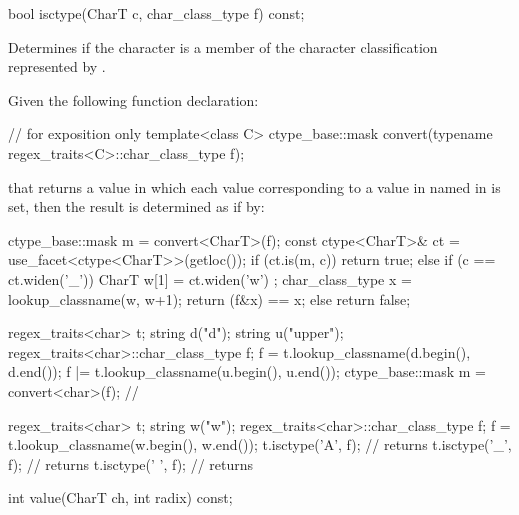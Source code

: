 %
\begin{itemdecl}
bool isctype(CharT c, char_class_type f) const;
\end{itemdecl}

\begin{itemdescr}
\pnum
\effects
Determines if the character  is a member of the character
classification represented by .

\pnum
\returns
Given the following function declaration:
\begin{codeblock}
// for exposition only
template<class C>
  ctype_base::mask convert(typename regex_traits<C>::char_class_type f);
\end{codeblock}
that returns a value in which each  value corresponding to
a value in  named in  is set, then the
result is determined as if by:
\begin{codeblock}
ctype_base::mask m = convert<CharT>(f);
const ctype<CharT>& ct = use_facet<ctype<CharT>>(getloc());
if (ct.is(m, c)) {
  return true;
} else if (c == ct.widen('_')) {
  CharT w[1] = { ct.widen('w') };
  char_class_type x = lookup_classname(w, w+1);
  return (f&x) == x;
} else {
  return false;
}
\end{codeblock}
\begin{example}
\begin{codeblock}
regex_traits<char> t;
string d("d");
string u("upper");
regex_traits<char>::char_class_type f;
f = t.lookup_classname(d.begin(), d.end());
f |= t.lookup_classname(u.begin(), u.end());
ctype_base::mask m = convert<char>(f);  // 
\end{codeblock}
\end{example}
\begin{example}
\begin{codeblock}
regex_traits<char> t;
string w("w");
regex_traits<char>::char_class_type f;
f = t.lookup_classname(w.begin(), w.end());
t.isctype('A', f);  // returns 
t.isctype('_', f);  // returns 
t.isctype(' ', f);  // returns 
\end{codeblock}
\end{example}
\end{itemdescr}

%
\begin{itemdecl}
int value(CharT ch, int radix) const;
\end{itemdecl}

